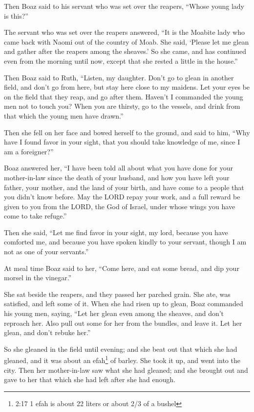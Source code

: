 \myverse{}Then Boaz said to his servant who was set over the reapers, “Whose
young lady is this?”

\myverse{}The servant who was set over the reapers answered, “It is the Moabite
lady who came back with Naomi out of the country of Moab.
\myverse{}She said, ‘Please let me glean and gather after the reapers among the sheaves.’
So she came, and has continued even from the morning until now, except that she rested a little in the
house.”

\myverse{}Then Boaz said to Ruth, “Listen, my daughter. Don’t go to glean
in another field, and don’t go from here, but stay here close to my maidens.
\myverse{}Let your eyes be on the field that they reap, and go after them. Haven’t I commanded
the young men not to touch you? When you are thirsty, go to the vessels, and drink from that which the
young men have drawn.”

\myverse{}Then she fell on her face and bowed herself to the ground, and
said to him, “Why have I found favor in your sight, that you should take knowledge of me, since I am a
foreigner?”

\myverse{}Boaz answered her, “I have been told all about what you have
done for your mother-in-law since the death of your husband, and how you have left your father, your mother,
and the land of your birth, and have come to a people that you didn’t know before.
\myverse{}May the LORD repay your work, and a full reward be given to you from the LORD,
the God of Israel, under whose wings you have come to take refuge.”

\myverse{}Then she said, “Let me find favor in your sight, my lord, because
you have comforted me, and because you have spoken kindly to your servant, though I am not as one of your
servants.”

\myverse{}At meal time Boaz said to her, “Come here, and eat some bread,
and dip your morsel in the vinegar.”

She sat beside the reapers, and they passed her parched grain. She ate, was satisfied, and
left some of it.
\myverse{}When she had risen up to glean, Boaz commanded his young men, saying, “Let
her glean even among the sheaves, and don’t reproach her.
\myverse{}Also pull out some for her from the bundles, and leave it. Let her glean,
and don’t rebuke her.”

\myverse{}So she gleaned in the field until evening; and she beat out that
which she had gleaned, and it was about an efah\footnote{  2:17 1 efah is about 22 liters or about 2/3 of a bushel} of barley.
\myverse{}She took it up, and went into the city. Then her mother-in-law saw what she
had gleaned; and she brought out and gave to her that which she had left after she had enough.

